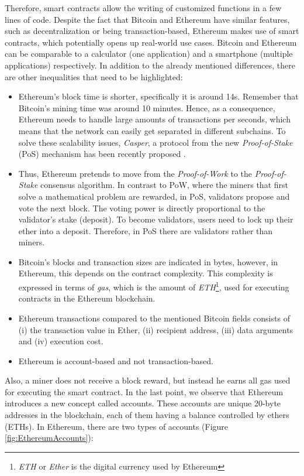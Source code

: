 Therefore, smart contracts allow the writing of customized functions in a few lines of code. Despite the fact that Bitcoin and Ethereum have similar features, such as decentralization or being transaction-based, Ethereum makes use of smart contracts, which potentially opens up real-world use cases. Bitcoin and Ethereum can be comparable to a calculator (one application) and a smartphone (multiple applications) respectively. In addition to the already mentioned differences, there are other inequalities that need to be highlighted:

\begin{itemize}
	
	\item Ethereum's block time is shorter, specifically it is around 14s. Remember that Bitcoin's mining time was around 10 minutes. Hence, as a consequence, Ethereum needs to handle large amounts of transactions per seconds, which means that the network can easily get separated in different subchains. To solve these scalability issues, \textit{Casper}, a protocol from the new \textit{Proof-of-Stake} (PoS) mechanism has been recently proposed \cite{proofOfStake}.
	\item Thus, Ethereum pretends to move from the \textit{Proof-of-Work} to the \textit{Proof-of-Stake} consensus algorithm. In contrast to PoW, where the miners that first solve a mathematical problem are rewarded, in PoS, validators propose and vote the next block. The voting power is directly proportional to the validator's stake (deposit). To become validators, users need to lock up their ether into a deposit. Therefore, in PoS there are validators rather than miners.
	\item Bitcoin's blocks and transaction sizes are indicated in bytes, however, in Ethereum, this depends on the contract complexity. This complexity is expressed in terms of \textit{gas}, which is the amount of \textit{ETH}\footnote{\textit{ETH} or \textit{Ether} is the digital currency used by Ethereum}, used for executing contracts in the Ethereum blockchain. 

	\item Ethereum transactions compared to the mentioned Bitcoin fields consists of (i) the transaction value in Ether, (ii) recipient address, (iii) data arguments and (iv) execution cost.
	\item Ethereum is account-based and not transaction-based.
\end{itemize}
Also, a miner does not receive a block reward, but instead he earns all gas used for executing the smart contract.
In the last point, we observe that Ethereum introduces a new concept called accounts. These accounts are unique 20-byte addresses in the blockchain, each of them having a balance controlled by ethers (ETHs). In Ethereum, there are two types of accounts (Figure \ref{fig:EthereumAccounts}):

